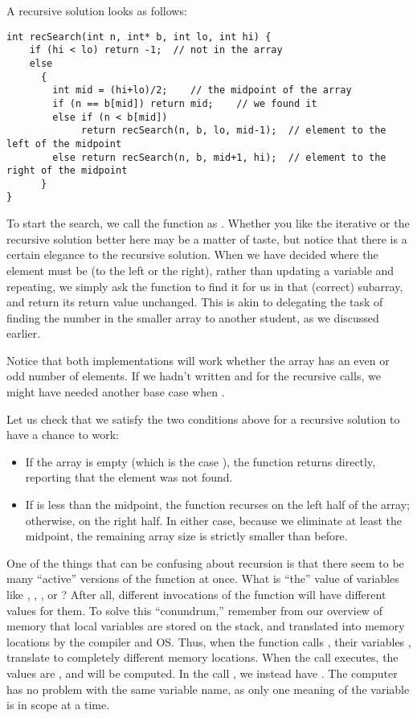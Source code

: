A recursive solution looks as follows:

\begin{verbatim}
int recSearch(int n, int* b, int lo, int hi) {
    if (hi < lo) return -1;  // not in the array
    else 
      {
        int mid = (hi+lo)/2;    // the midpoint of the array
        if (n == b[mid]) return mid;    // we found it
        else if (n < b[mid]) 
             return recSearch(n, b, lo, mid-1);  // element to the left of the midpoint
        else return recSearch(n, b, mid+1, hi);  // element to the right of the midpoint
      }
}
\end{verbatim}

To start the search, we call the function as .
Whether you like the iterative or the recursive solution better here
may be a matter of taste, but notice that there is a certain elegance
to the recursive solution.
When we have decided where the element must be (to the left or the right),
rather than updating a variable and repeating,
we simply ask the function to find it for us in that (correct) subarray,
and return its return value unchanged.
This is akin to delegating the task of finding the number in the
smaller array to another student, as we discussed earlier.

Notice that both implementations will work whether the array has an
even or odd number of elements.
If we hadn't written  and  for the recursive calls,
we might have needed another base case when . 

Let us check that we satisfy the two conditions above for a recursive
solution to have a chance to work:
\begin{itemize}
\item If the array is empty (which is the case ),
  the function returns directly,
  reporting that the element was not found. 
\item If  is less than the midpoint,
  the function recurses on the left half of the array;
  otherwise, on the right half.
  In either case, because we eliminate at least the midpoint,
  the remaining array size is strictly smaller than before.
\end{itemize}

One of the things that can be confusing about recursion is that there
seem to be many ``active'' versions of the function at once.
What is ``the'' value of variables like , ,
, or ?
After all, different invocations of the function will have different
values for them.
To solve this ``conundrum,'' remember from our overview of memory that
local variables are stored on the stack, and translated into memory
locations by the compiler and OS.
Thus, when the function  calls
, their variables , 
translate to completely different memory locations.
When the call  executes,
the values are , and  will be computed.
In the call ,
we instead have .
The computer has no problem with the same variable name,
as only one meaning of the variable is in scope at a time.

